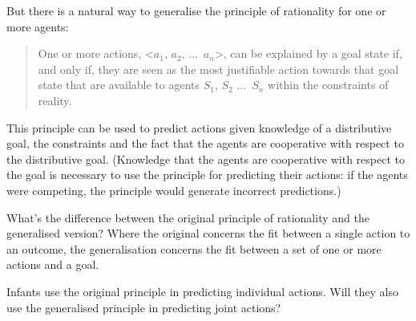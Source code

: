 \documentclass[12pt,\papersize]{extarticle}
\begin{document}
But there is a natural way to generalise the principle of rationality for one or more agents:
%
\begin{quote}
One or more actions, <$a_1$, $a_2$, ...\ $a_n$>, can be explained by a goal state if, and only if, they are seen as the most justifiable action towards that goal state that are available to agents $S_1$, $S_2$ ...\ $S_n$
within the constraints of reality.
\end{quote}
%
This principle can be used to predict actions given knowledge of a distributive goal, the constraints and the fact that the agents are cooperative with respect to the distributive goal.
(Knowledge that the agents are cooperative with respect to the goal is necessary to use the principle for predicting their actions: if the agents were competing, the principle would generate incorrect predictions.)


What's the difference between the original principle of rationality and the generalised version?
Where the original concerns the fit between a single action to an outcome, the generalisation concerns the fit between a set of one or more actions and a goal.

Infants use the original principle in predicting individual actions. 
Will they also use the generalised principle in predicting joint actions?



\small

\end{document}
